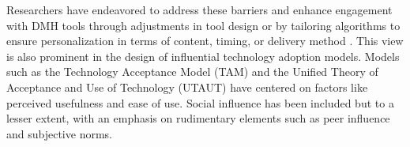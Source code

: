 





Researchers have endeavored to address these barriers and enhance engagement with DMH tools through adjustments in tool design or by tailoring algorithms to ensure personalization in terms of content, timing, or delivery method \cite{doherty2012engagement, harding2015hci, poole2013hci, xu2013designing, howe2022design}. This view is also prominent in the design of influential technology adoption models. Models such as the Technology Acceptance Model (TAM) \cite{marangunic2015technology, venkatesh2008technology, davis1989perceived} and the Unified Theory of Acceptance and Use of Technology (UTAUT) \cite{venkatesh2003user, dwivedi2019re} have centered on factors like perceived usefulness and ease of use. Social influence has been included but to a lesser extent, with an emphasis on rudimentary elements such as peer influence and subjective norms.

